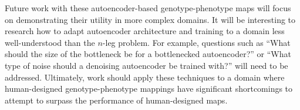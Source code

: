 Future work with these autoencoder-based genotype-phenotype maps will focus on demonstrating their utility in more complex domains.
It will be interesting to research how to adapt autoencoder architecture and training to a domain less well-understood than the $n$-leg problem.
For example, questions such as ``What should the size of the bottleneck be for a bottlenecked autoencoder?'' or ``What type of noise should a denoising autoencoder be trained with?'' will need to be addressed.
Ultimately, work should apply these techniques to a domain where human-designed genotype-phenotype mappings have significant shortcomings to attempt to surpass the performance of human-designed maps.
